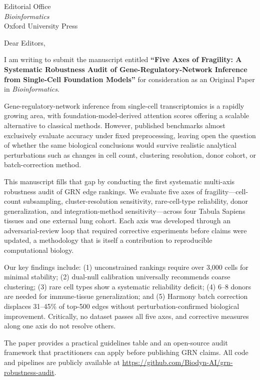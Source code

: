\documentclass[12pt]{letter}
\date{\today}
\begin{document}
\begin{letter}{Editorial Office\\
\textit{Bioinformatics}\\
Oxford University Press}

\opening{Dear Editors,}

I am writing to submit the manuscript entitled \textbf{``Five Axes of Fragility: A Systematic Robustness Audit of Gene-Regulatory-Network Inference from Single-Cell Foundation Models''} for consideration as an Original Paper in \textit{Bioinformatics}.

Gene-regulatory-network inference from single-cell transcriptomics is a rapidly growing area, with foundation-model-derived attention scores offering a scalable alternative to classical methods. However, published benchmarks almost exclusively evaluate accuracy under fixed preprocessing, leaving open the question of whether the same biological conclusions would survive realistic analytical perturbations such as changes in cell count, clustering resolution, donor cohort, or batch-correction method.

This manuscript fills that gap by conducting the first systematic multi-axis robustness audit of GRN edge rankings. We evaluate five axes of fragility---cell-count subsampling, cluster-resolution sensitivity, rare-cell-type reliability, donor generalization, and integration-method sensitivity---across four Tabula Sapiens tissues and one external lung cohort. Each axis was developed through an adversarial-review loop that required corrective experiments before claims were updated, a methodology that is itself a contribution to reproducible computational biology.

Our key findings include: (1) unconstrained rankings require over 3,000 cells for minimal stability; (2) dual-null calibration universally recommends coarse clustering; (3) rare cell types show a systematic reliability deficit; (4) 6--8 donors are needed for immune-tissue generalization; and (5) Harmony batch correction displaces 31--45\% of top-500 edges without perturbation-confirmed biological improvement. Critically, no dataset passes all five axes, and corrective measures along one axis do not resolve others.

The paper provides a practical guidelines table and an open-source audit framework that practitioners can apply before publishing GRN claims. All code and pipelines are publicly available at \url{https://github.com/Biodyn-AI/grn-robustness-audit}.


\end{letter}
\end{document}
